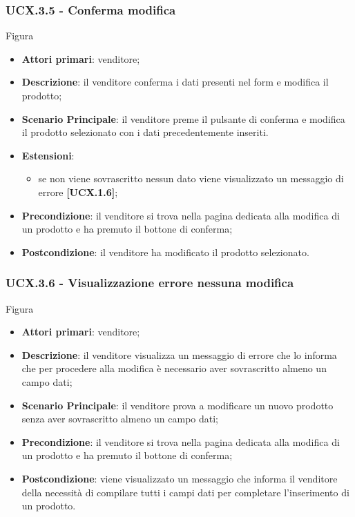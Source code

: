 \subsubsection{UCX.3.5 - Conferma modifica}
Figura \\
\begin{itemize}
\item \textbf{Attori primari}: venditore;
\item \textbf{Descrizione}: il venditore conferma i dati presenti nel form e modifica il prodotto;
\item \textbf{Scenario Principale}: il venditore preme il pulsante di conferma e modifica il prodotto selezionato con i dati precedentemente inseriti.
\item \textbf{Estensioni}: 
\begin{itemize}
	\item se non viene sovrascritto nessun dato viene visualizzato un messaggio di errore \textbf{[UCX.1.6]};
\end{itemize} 
\item \textbf{Precondizione}: il venditore si trova nella pagina dedicata alla modifica di un prodotto e ha premuto il bottone di conferma;
\item \textbf{Postcondizione}: il venditore ha modificato il prodotto selezionato.
\end{itemize}

\subsubsection{UCX.3.6 - Visualizzazione errore nessuna modifica}
Figura \\
\begin{itemize}
\item \textbf{Attori primari}: venditore;
\item \textbf{Descrizione}: il venditore visualizza un messaggio di errore che lo informa che per procedere alla modifica è necessario aver sovrascritto almeno un campo dati;
\item \textbf{Scenario Principale}: il venditore prova a modificare un nuovo prodotto senza aver sovrascritto almeno un campo dati;
\item \textbf{Precondizione}: il venditore si trova nella pagina dedicata alla modifica di un prodotto e ha premuto il bottone di conferma;
\item \textbf{Postcondizione}: viene visualizzato un messaggio che informa il venditore della necessità di compilare tutti i campi dati per completare l'inserimento di un prodotto.
\end{itemize}

